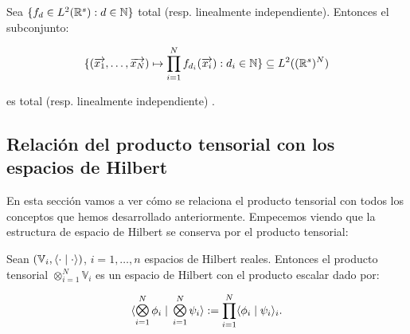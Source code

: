\begin{proposicion} \label{prop:conservacion_totalidad_indp_lineal_func_prod}
    Sea $\{ f_d \in L^2(\mathbb{R}^s): d \in \mathbb{N}  \}$ total (resp. linealmente independiente). Entonces el subconjunto:

    \begin{equation}
        \{ (\overrightarrow{x_1}, \ldots, \overrightarrow{x_N}) \mapsto \prod_{i = 1}^N f_{d_i}(\overrightarrow{x_i}): d_i \in \mathbb{N} \} \subseteq L^2((\mathbb{R}^s)^N)
    \end{equation}

    es total (resp. linealmente independiente) \cite{matematicas:descomposicion_ht}.
\end{proposicion}

\subsection{Relación del producto tensorial con los espacios de Hilbert}

En esta sección vamos a ver cómo se relaciona el producto tensorial con todos los conceptos que hemos desarrollado anteriormente. Empecemos viendo que la estructura de espacio de Hilbert se conserva por el producto tensorial:

\begin{proposicion}

    Sean $(\mathbb{V}_i, \langle \cdot \; | \; \cdot \rangle)$, $i = 1, \ldots, n$ espacios de Hilbert reales. Entonces el producto tensorial $\otimes_{i = 1}^N \mathbb{V}_i$ es un espacio de Hilbert con el producto escalar dado por:

    \begin{equation}
        \innerproduct{\MediumOtimes_{i = 1}^{N} \phi_i}{\MediumOtimes_{i = 1}^{N} \psi_i} := \prod_{i = 1}^{N} \innerproduct{\phi_i}{\psi_i}_i.
    \end{equation}

\end{proposicion}

